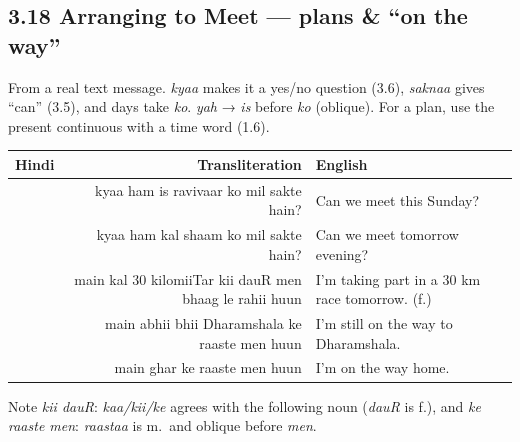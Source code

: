 \subsection{3.18 Arranging to Meet — plans \& ``on the way''}


From a real text message. \textit{kyaa} makes it a yes/no question (3.6), \textit{saknaa} gives ``can'' (3.5), and days take \textit{ko}.
\textit{yah} → \textit{is} before \textit{ko} (oblique). For a plan, use the present continuous with a time word (1.6).

\begin{tabular}{@{}HRG@{}}
  \toprule
  Hindi & Transliteration & English \\
  \midrule
   & kyaa ham is ravivaar ko mil sakte hain? & Can we meet this Sunday? \\
     & kyaa ham kal shaam ko mil sakte hain?  & Can we meet tomorrow evening? \\
   & main kal 30 kilomiiTar kii dauR men bhaag le rahii huun & I'm taking part in a 30 km race tomorrow. (f.) \\
   & main abhii bhii Dharamshala ke raaste men huun & I'm still on the way to Dharamshala. \\
            & main ghar ke raaste men huun           & I'm on the way home. \\
  \bottomrule
\end{tabular}

Note \textit{kii dauR}: \textit{kaa/kii/ke} agrees with the following noun (\textit{dauR} is f.), and \textit{ke raaste men}: \textit{raastaa} is m.\ and oblique before \textit{men}.

